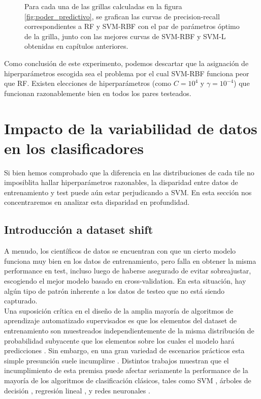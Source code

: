 \begin{figure}[h!]
\begin{tabular}{cccc}
\end{tabular}
\caption{Para cada una de las grillas calculadas en la figura \protect\ref{fig:poder_predictivo}, se grafican las curvas de precision-recall correspondientes a RF y SVM-RBF con el par de parámetros óptimo de la grilla, junto con las mejores curvas de SVM-RBF y SVM-L obtenidas en capítulos anteriores. }
\label{fig:poder_predictivo_curvas}
\end{figure}

Como conclusión de este experimento, podemos descartar que la asignación de hiperparámetros escogida sea el problema por el cual SVM-RBF funciona peor que RF. Existen elecciones de hiperparámetros (como $C=10^4$ y $\gamma=10^{-4}$) que funcionan razonablemente bien en todos los pares testeados.

\section{Impacto de la variabilidad de datos en los clasificadores}

Si bien hemos comprobado que la diferencia en las distribuciones de cada tile no imposiblita hallar hiperparámetros razonables, la disparidad entre datos de entrenamiento y test puede aún estar perjudicando a SVM. En esta sección nos concentraremos en analizar esta disparidad en profundidad.

\subsection{Introducción a dataset shift}

A menudo, los científicos de datos se encuentran con que un cierto modelo funciona muy bien en los datos de entrenamiento, pero falla en obtener la misma performance en test, incluso luego de haberse asegurado de evitar sobreajustar, escogiendo el mejor modelo basado en cross-validation. En esta situación, hay algún tipo de patrón inherente a los datos de testeo que no está siendo capturado.\\

Una suposición crítica en el diseño de la amplia mayoría de algoritmos de aprendizaje automatizado supervisados es que los elementos del dataset de entrenamiento son muestreados independientemente de la misma distribución de probabilidad subyacente que los elementos sobre los cuales el modelo hará predicciones \cite{non-stationary} \cite{kouw2019introduction} \cite{selectionbias} \cite{GeetaDharani2019CovariateSA}  \cite{RePEc:hin:jnlmpe:302815}. Sin embargo, en una gran variedad de escenarios prácticos esta simple presunción suele incumplirse \cite{non-stationary} \cite{GeetaDharani2019CovariateSA} \cite{quinonero2009dataset}.  Distintos trabajos muestran que el incumplimiento de esta premisa puede afectar seriamente la performance de la mayoría de los algoritmos de clasificación clásicos, tales como SVM \cite{selectionbias}, árboles de decisión \cite{selectionbias}, regresión lineal \cite{pmlr-v51-chen16d}, y redes neuronales \cite{RePEc:hin:jnlmpe:302815}.  \\

